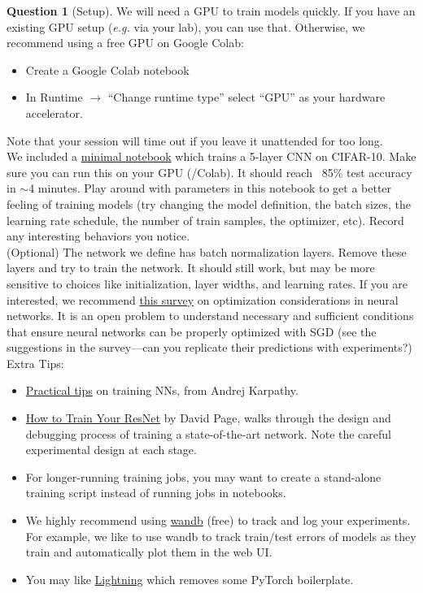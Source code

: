 \documentclass{article}
\theoremstyle{definition}
\newtheorem{subquestion}{Question}[question]
\begin{document}
\begin{subquestion}[Setup]
We will need a GPU to train models quickly. If you have an existing GPU setup (\textit{e.g.} via your lab), you can use that. Otherwise, we recommend using a free GPU on Google Colab:
\begin{itemize}
    \item Create a Google Colab notebook
    \item In Runtime $\rightarrow$ ``Change runtime type'' select ``GPU'' as your hardware accelerator. 
\end{itemize}

Note that your session will time out if you leave it unattended for too long. \\

We included a \href{https://colab.research.google.com/drive/1E838sz34fNS2OjsznT_hWIM_eulX4g2x?usp=sharing}{minimal notebook} which trains a 5-layer CNN on CIFAR-10. Make sure you can run this on your GPU (/Colab). It should reach ~85\% test accuracy in ${\sim}$4 minutes. Play around with parameters in this notebook to get a better feeling of training models (try changing the model definition, the batch sizes, the learning rate schedule, the number of train samples, the optimizer, etc). Record any interesting behaviors you notice. \\

(Optional) The network we define has batch normalization layers. Remove these layers and try to train the network. It should still work, but may be more sensitive to choices like initialization, layer widths, and learning rates. If you are interested, we recommend \href{https://arxiv.org/abs/1912.08957} {this survey} on optimization considerations in neural networks. It is an open problem to understand necessary and sufficient conditions that ensure neural networks can be properly optimized with SGD (see the suggestions in the survey---can you replicate their predictions with experiments?) \\
    
Extra Tips:
\begin{itemize}
    \item \href{http://karpathy.github.io/2019/04/25/recipe/}{Practical tips} on training NNs, from Andrej Karpathy.
    \item \href{https://myrtle.ai/learn/how-to-train-your-resnet/}{How to Train Your ResNet} by David Page, walks through the design and debugging process of training a state-of-the-art network. Note the careful experimental design at each stage.
    \item For longer-running training jobs, you may want to create a stand-alone training script instead of running jobs in notebooks.
    \item We highly recommend using \href{http://wandb.ai/}{wandb} (free) to track and log your experiments. For example, we like to use wandb to track train/test errors of models as they train and automatically plot them in the web UI.
    \item You may like \href{https://www.pytorchlightning.ai/}{Lightning} which removes some PyTorch boilerplate.
\end{itemize}
\end{subquestion}
\end{document}
